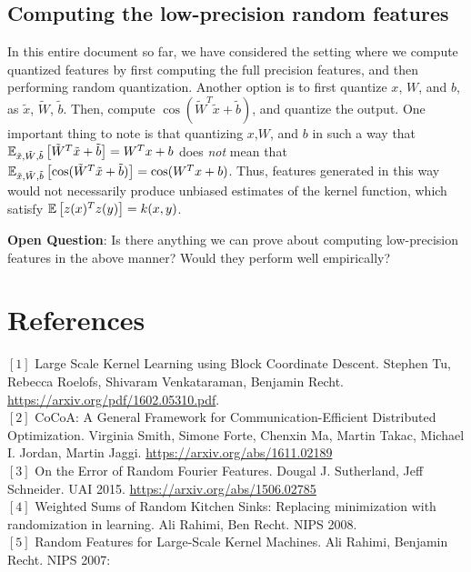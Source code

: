 \documentclass[12pt]{article}
\newcommand{\sq}{\sqrt{2}}
\newcommand{\tx}{\tilde{x}}
\newcommand{\tW}{\tilde{W}}
\newcommand{\tb}{\tilde{b}}
\newcommand{\teps}{\tilde{\epsilon}}
\newcommand{\tS}{\tilde{S}}
\begin{document}
\subsection{Computing the low-precision random features}
In this entire document so far, we have considered the setting where we compute quantized features by first computing the full precision features, and then performing random quantization.  Another option is to 
first quantize $x$, $W$, and $b$, as $\tx$, $\tW$, $\tb$.  Then, compute $\cos(\tW^T \tx + \tb)$, and quantize the output.
One important thing to note is that quantizing $x$,$W$, and $b$ in such a way that $\expect{\tx,\tW,\tb}{\tW^T\tx + \tb} = W^Tx+b$ does \textit{not} mean that $\expect{\tx,\tW,\tb}{\cos(\tW^T\tx + \tb)} = \cos(W^Tx + b)$.  Thus, features generated in this way would not necessarily produce unbiased estimates of the kernel function, which satisfy $\expect{}{z(x)^Tz(y)} = k(x,y)$.

\noindent \textbf{Open Question}: Is there anything we can prove about computing low-precision features in the above manner? Would they perform well empirically?



\section{References}
\noindent$[1]$ Large Scale Kernel Learning using Block Coordinate Descent.
Stephen Tu, Rebecca Roelofs, Shivaram Venkataraman, Benjamin Recht. \url{https://arxiv.org/pdf/1602.05310.pdf}. \\
$[2]$ CoCoA: A General Framework for Communication-Efficient Distributed Optimization.
Virginia Smith, Simone Forte, Chenxin Ma, Martin Takac, Michael I. Jordan, Martin Jaggi.  \url{https://arxiv.org/abs/1611.02189} \\
$[3]$ On the Error of Random Fourier Features. Dougal J. Sutherland, Jeff Schneider. UAI 2015. \url{https://arxiv.org/abs/1506.02785}\\
$[4]$ Weighted Sums of Random Kitchen Sinks: Replacing minimization with randomization in learning. Ali Rahimi, Ben Recht. NIPS 2008.\\
$[5]$	Random Features for Large-Scale Kernel Machines. Ali Rahimi, Benjamin Recht. NIPS 2007:
\end{document}
